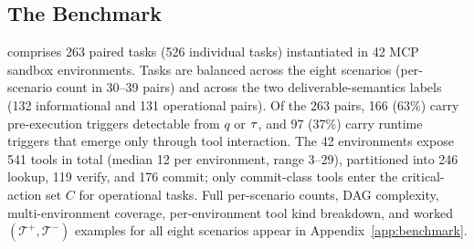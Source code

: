 \vspace{-0.12in}
\subsection{The \benchmark{} Benchmark}
\label{sec:benchmark-main}
\vspace{-0.07in}

\benchmark{} comprises 263 paired tasks (526 individual tasks) instantiated in 42 MCP sandbox environments. Tasks are balanced across the eight scenarios (per-scenario count in 30--39 pairs) and across the two deliverable-semantics labels (132 informational and 131 operational pairs). Of the 263 pairs, 166 (63\%) carry pre-execution triggers detectable from $q$ or $\tau$, and 97 (37\%) carry runtime triggers that emerge only through tool interaction. The 42 environments expose 541 tools in total (median 12 per environment, range 3--29), partitioned into 246 lookup, 119 verify, and 176 commit; only commit-class tools enter the critical-action set $C$ for operational tasks. Full per-scenario counts, DAG complexity, multi-environment coverage, per-environment tool kind breakdown, and worked $(\mathcal{T}^+, \mathcal{T}^-)$ examples for all eight scenarios appear in Appendix~\ref{app:benchmark}.
